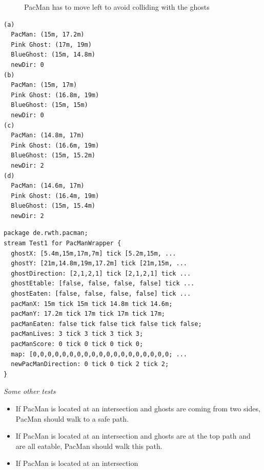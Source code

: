\begin{figure}[!h]
	\caption{PacMan has to move left to avoid colliding with the ghosts} 
	\label{fig:pacManFleeing}
\end{figure}
\begin{lstlisting}[caption={Values for the stream test},label=lst:pmStreamValues, frame=single]
(a)
  PacMan: (15m, 17.2m) 
  Pink Ghost: (17m, 19m) 
  BlueGhost: (15m, 14.8m) 
  newDir: 0
(b)	
  PacMan: (15m, 17m) 
  Pink Ghost: (16.8m, 19m) 
  BlueGhost: (15m, 15m) 
  newDir: 0
(c)	
  PacMan: (14.8m, 17m) 
  Pink Ghost: (16.6m, 19m) 
  BlueGhost: (15m, 15.2m) 
  newDir: 2
(d)	
  PacMan: (14.6m, 17m) 
  Pink Ghost: (16.4m, 19m)
  BlueGhost: (15m, 15.4m)
  newDir: 2
\end{lstlisting}

\begin{lstlisting}[caption={Stream test for the scenario above},label=lst:pmStreamTest, frame=single, morekeywords={tick, stream, for, package}]
package de.rwth.pacman;
stream Test1 for PacManWrapper {
  ghostX: [5.4m,15m,17m,7m] tick [5.2m,15m, ...
  ghostY: [21m,14.8m,19m,17.2m] tick [21m,15m, ...
  ghostDirection: [2,1,2,1] tick [2,1,2,1] tick ...
  ghostEtable: [false, false, false, false] tick ...
  ghostEaten: [false, false, false, false] tick ...
  pacManX: 15m tick 15m tick 14.8m tick 14.6m;
  pacManY: 17.2m tick 17m tick 17m tick 17m;
  pacManEaten: false tick false tick false tick false;
  pacManLives: 3 tick 3 tick 3 tick 3;
  pacManScore: 0 tick 0 tick 0 tick 0;
  map: [0,0,0,0,0,0,0,0,0,0,0,0,0,0,0,0,0,0,0; ...
  newPacManDirection: 0 tick 0 tick 2 tick 2;
}
\end{lstlisting}

\emph{Some other tests}
\begin{itemize}
	\item If PacMan is located at an intersection and ghosts are coming from two sides, PacMan should walk to a safe path.
	\item If PacMan is located at an intersection and ghosts are at the top path and are all eatable, PacMan should walk this path.
	\item If PacMan is located at an intersection
\end{itemize}


